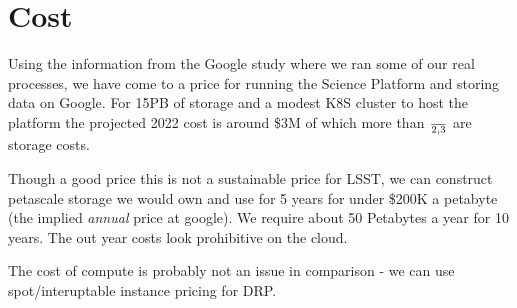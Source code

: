 
\section{Cost}
Using the information from the Google study where we ran some of our real processes, we have come to a price for running the \gls{Science Platform} and storing data on Google. For 15PB of storage and a modest K8S cluster to host the platform the projected 2022 cost is around \$3M of which more than $\over{2,3}$ are storage costs.

Though a good price this is not a sustainable price for \gls{LSST}, we can construct petascale storage we would own and use for 5 years for under \$200K a petabyte (the implied \emph{annual} price at google).  We require about 50 Petabytes a year for 10 years. The out year costs look prohibitive on the cloud.

The cost of compute is probably not an issue in comparison - we can use spot/interuptable instance pricing for DRP.





